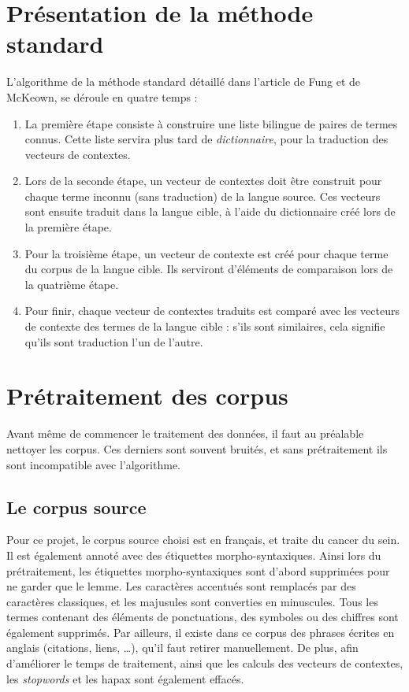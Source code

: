 
\section{Présentation de la méthode standard}

	L'algorithme de la méthode standard détaillé dans l'article de Fung et de McKeown, se déroule en quatre temps :
	\begin{enumerate}
		\item La première étape consiste à construire une liste bilingue de paires de termes connus. Cette liste servira plus tard de \textit{dictionnaire}, pour la traduction des vecteurs de contextes. 
		\item Lors de la seconde étape, un vecteur de contextes doit être construit pour chaque terme inconnu (sans traduction) de la langue source. Ces vecteurs sont ensuite traduit dans la langue cible, à l'aide du dictionnaire créé lors de la première étape.
		\item Pour la troisième étape, un vecteur de contexte est créé pour chaque terme du corpus de la langue cible. Ils serviront d'éléments de comparaison lors de la quatrième étape.
		\item Pour finir, chaque vecteur de contextes traduits est comparé avec les vecteurs de contexte des termes de la langue cible : s'ils sont similaires, cela signifie qu'ils sont traduction l'un de l'autre. 
	\end{enumerate}


\section{Prétraitement des corpus}
	
	Avant même de commencer le traitement des données, il faut au préalable nettoyer les corpus. Ces derniers sont souvent bruités, et sans prétraitement ils sont incompatible avec l'algorithme.
	
	\subsection{Le corpus source}
	Pour ce projet, le corpus source choisi est en français, et traite du cancer du sein. Il est également annoté avec des étiquettes morpho-syntaxiques. Ainsi lors du prétraitement, les étiquettes morpho-syntaxiques sont d'abord supprimées pour ne garder que le lemme. Les caractères accentués sont remplacés par des caractères classiques, et les majusules sont converties en minuscules. Tous les termes contenant des éléments de ponctuations, des symboles ou des chiffres sont également supprimés. Par ailleurs, il existe dans ce corpus des phrases écrites en anglais (citations, liens, \dots), qu'il faut retirer manuellement. De plus, afin d'améliorer le temps de traitement, ainsi que les calculs des vecteurs de contextes, les \textit{stopwords} et les hapax sont également effacés.
		
